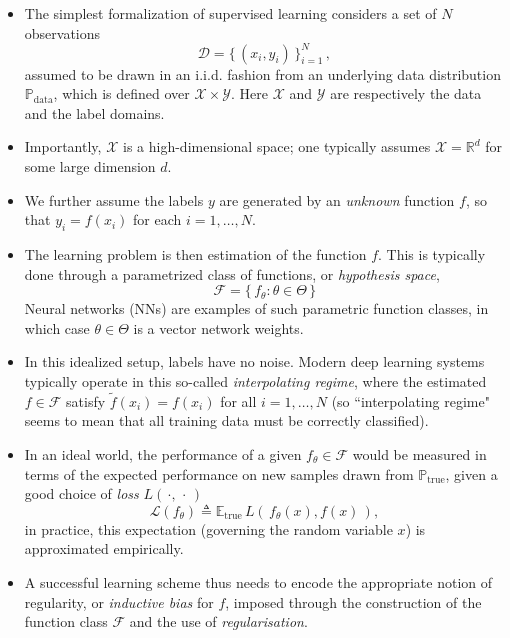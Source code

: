 \documentclass[12pt]{article}
\numberwithin{equation}{section}
\theoremstyle{definition}
\newcommand{		\1		}	{	\bm{1}					}%
\begin{document}
\begin{itemize}
\item The simplest formalization of supervised learning considers a set of $N$ observations 
    $$
    \mathcal{D} = \{ \, (x_i, y_i) \, \}_{i=1}^N \,,
    $$
    assumed to be drawn in an i.i.d. fashion from an underlying data distribution $\mathbb{P}_{\textrm{data}}$, which is defined over $\mathcal{X} \times \mathcal{Y}$.  Here $\mathcal{X}$ and $\mathcal{Y}$ are respectively the data and the label domains. 
    
\item Importantly, $\mathcal{X}$ is a high-dimensional space; one typically assumes $\mathcal{X} = \mathbb{R}^d$ for some large dimension $d$. 

\item We further assume the labels $y$ are generated by an \emph{unknown} function $f$, so that  $y_i = f(x_i)$ for each $i =1, \dots, N$. 

\item The learning problem is then estimation of the function $f$. This is typically done through a parametrized class of functions, or \emph{hypothesis space},
	$$
	\mathcal{F} = \{ \, f_{\theta} : \theta \in \Theta\, \} 
	$$
	Neural networks (NNs) are examples of such parametric function classes, in which case $\theta \in \Theta$ is a vector network weights.

\item In this idealized setup, labels have no noise. Modern deep learning systems typically operate in this so-called \emph{interpolating regime}, where the estimated $f \in \mathcal{F}$ satisfy $\tilde{f}(x_i) = f(x_i)$ for all $i = 1, \dots, N$ (so ``interpolating regime" seems to mean that all training data must be correctly classified). 

\item In an ideal world, the performance of a given $f_\theta \in \mathcal{F}$ would be measured in terms of the expected performance on new samples drawn from $\mathbb{P}_{\textrm{true}}$, given a good choice of \emph{loss} $L(\,\cdot,\,\cdot\,)$
    $$
    \mathcal{L}(f_\theta) \triangleq \mathbb{E}_{\textrm{true}} \, L ( \, f_\theta(x), f(x) \,) ,
    $$
    in practice, this expectation (governing the random variable $x$) is approximated empirically. 
    
\item A successful learning scheme thus needs to encode the appropriate notion of regularity, or \emph{inductive bias} for $f$, imposed through the construction of the function class $\mathcal{F}$ and the use of \emph{regularisation}. 
\end{itemize}
\end{document}
